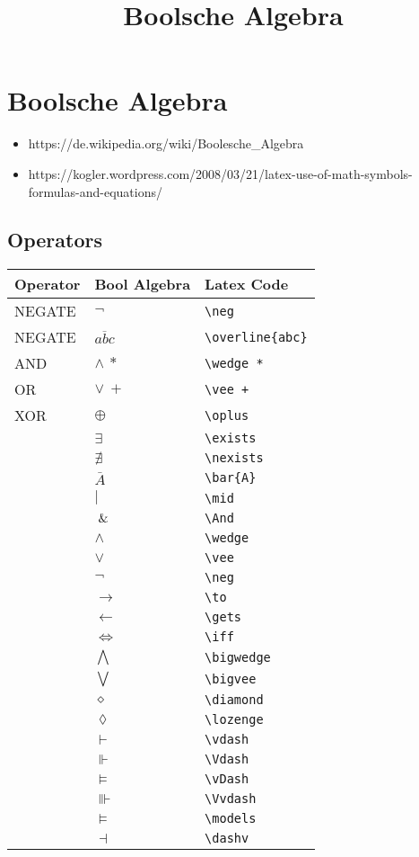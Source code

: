 \documentclass[11pt]{article}
\title{Boolsche Algebra}
\providecommand{\tightlist}{%
      \setlength{\itemsep}{0pt}\setlength{\parskip}{0pt}}
\begin{document}
    \maketitle




    \section{Boolsche Algebra}\label{boolsche-algebra}

\begin{itemize}
\tightlist
\item
  https://de.wikipedia.org/wiki/Boolesche\_Algebra
\item
  https://kogler.wordpress.com/2008/03/21/latex-use-of-math-symbols-formulas-and-equations/
\end{itemize}

    \subsection{Operators}\label{operators}

    \begin{longtable}[]{@{}lll@{}}
\toprule
Operator & Bool Algebra & Latex Code\tabularnewline
\midrule
\endhead
NEGATE & \(\neg\) & \texttt{\textbackslash{}neg}\tabularnewline
NEGATE & \(\overline{abc}\) &
\texttt{\textbackslash{}overline\{abc\}}\tabularnewline
AND & \(\wedge\:*\) & \texttt{\textbackslash{}wedge\ *}\tabularnewline
OR & \(\vee\:+\) & \texttt{\textbackslash{}vee\ +}\tabularnewline
XOR & \(\oplus\) & \texttt{\textbackslash{}oplus}\tabularnewline
& \(\exists\) & \texttt{\textbackslash{}exists}\tabularnewline
& \(\nexists\) & \texttt{\textbackslash{}nexists}\tabularnewline
& \(\bar{A}\) & \texttt{\textbackslash{}bar\{A\}}\tabularnewline
& \(\mid\) & \texttt{\textbackslash{}mid}\tabularnewline
& \(\And\) & \texttt{\textbackslash{}And}\tabularnewline
& \(\wedge\) & \texttt{\textbackslash{}wedge}\tabularnewline
& \(\vee\) & \texttt{\textbackslash{}vee}\tabularnewline
& \(\neg\) & \texttt{\textbackslash{}neg}\tabularnewline
& \(\to\) & \texttt{\textbackslash{}to}\tabularnewline
& \(\gets\) & \texttt{\textbackslash{}gets}\tabularnewline
& \(\iff\) & \texttt{\textbackslash{}iff}\tabularnewline
& \(\bigwedge\) & \texttt{\textbackslash{}bigwedge}\tabularnewline
& \(\bigvee\) & \texttt{\textbackslash{}bigvee}\tabularnewline
& \(\diamond\) & \texttt{\textbackslash{}diamond}\tabularnewline
& \(\lozenge\) & \texttt{\textbackslash{}lozenge}\tabularnewline
& \(\vdash\) & \texttt{\textbackslash{}vdash}\tabularnewline
& \(\Vdash\) & \texttt{\textbackslash{}Vdash}\tabularnewline
& \(\vDash\) & \texttt{\textbackslash{}vDash}\tabularnewline
& \(\Vvdash\) & \texttt{\textbackslash{}Vvdash}\tabularnewline
& \(\models\) & \texttt{\textbackslash{}models}\tabularnewline
& \(\dashv\) & \texttt{\textbackslash{}dashv}\tabularnewline
\bottomrule
\end{longtable}
\end{document}

